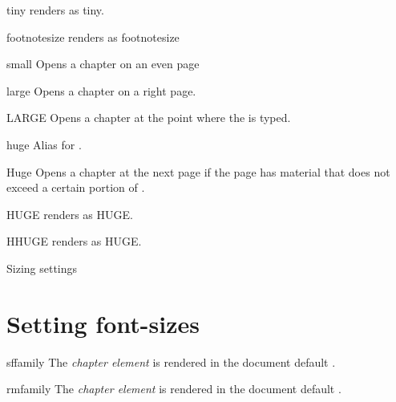 \begin{marglist}
\item [tiny] renders as {\tiny tiny}.
\item[footnotesize] renders as {\footnotesize footnotesize}
\item [small] Opens a chapter on an even page
\item [large] Opens a chapter on a right page.
\item [LARGE] Opens a chapter at the point where the  is typed.
\item [huge] Alias for .
\item [Huge] Opens a chapter at the next page if the page has material that does not exceed a certain portion of
 .
 \item[HUGE] renders as {\HUGE HUGE}.
 \item[HHUGE] renders as {\HHUGE HUGE}.
\end{marglist}

\begin{texexample}{Sizing settings}{}
\chapter{Setting font-sizes}          
\lorem

\end{texexample}




\begin{marglist}
\item [sffamily] The \emph{chapter element} is rendered in the document default \cmd{\sffamily}.
\item [rmfamily] The \emph{chapter element} is rendered in the document default \cmd{\rmfamily}.
\end{marglist}

